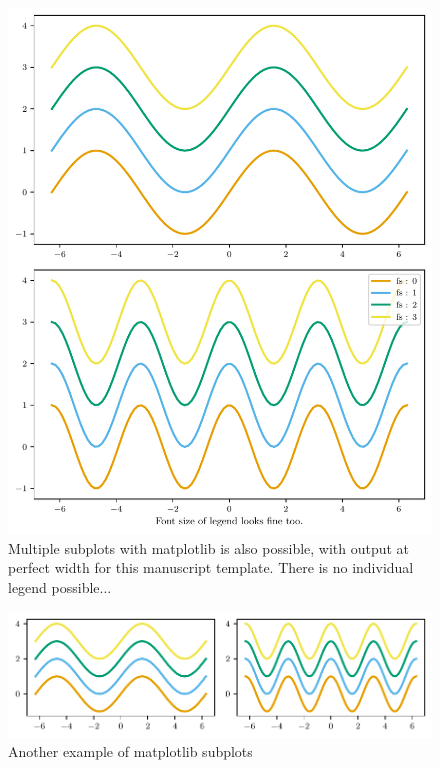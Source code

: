 \begin{figure}
	\centering
	\includegraphics{../Chap1/Figure/Figure_multiple_21.pdf}
	\caption{Multiple subplots with matplotlib is also possible, with output at perfect width for this manuscript template. There is no individual legend possible...}
	\label{Ch1:fig:multiple matplotlib 21}
\end{figure}

\begin{figure}
	\centering
	\includegraphics{../Chap1/Figure/Figure_multiple_12.pdf}
	\caption{Another example of matplotlib subplots}
	\label{Ch1:fig:multiple matplotlib 12}
\end{figure}

